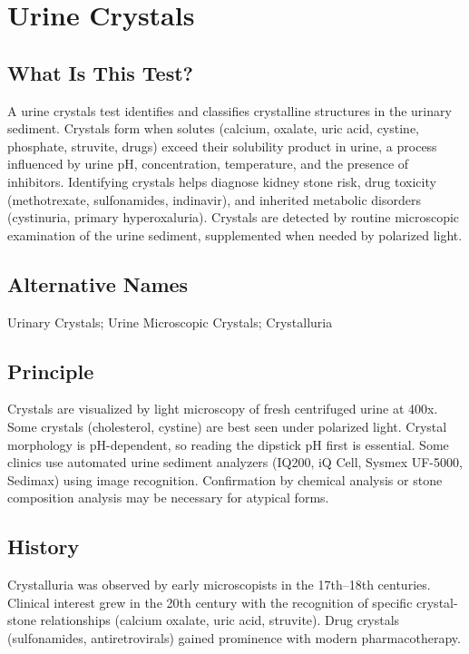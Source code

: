 \chapter{Urine Crystals}

\section*{What Is This Test?}
A urine crystals test identifies and classifies crystalline structures in the urinary sediment. Crystals form when solutes (calcium, oxalate, uric acid, cystine, phosphate, struvite, drugs) exceed their solubility product in urine, a process influenced by urine pH, concentration, temperature, and the presence of inhibitors. Identifying crystals helps diagnose kidney stone risk, drug toxicity (methotrexate, sulfonamides, indinavir), and inherited metabolic disorders (cystinuria, primary hyperoxaluria). Crystals are detected by routine microscopic examination of the urine sediment, supplemented when needed by polarized light.

\section*{Alternative Names}
Urinary Crystals; Urine Microscopic Crystals; Crystalluria

\section*{Principle}
Crystals are visualized by light microscopy of fresh centrifuged urine at 400x. Some crystals (cholesterol, cystine) are best seen under polarized light. Crystal morphology is pH-dependent, so reading the dipstick pH first is essential. Some clinics use automated urine sediment analyzers (IQ200, iQ Cell, Sysmex UF-5000, Sedimax) using image recognition. Confirmation by chemical analysis or stone composition analysis may be necessary for atypical forms.

\section*{History}
Crystalluria was observed by early microscopists in the 17th--18th centuries. Clinical interest grew in the 20th century with the recognition of specific crystal-stone relationships (calcium oxalate, uric acid, struvite). Drug crystals (sulfonamides, antiretrovirals) gained prominence with modern pharmacotherapy.

